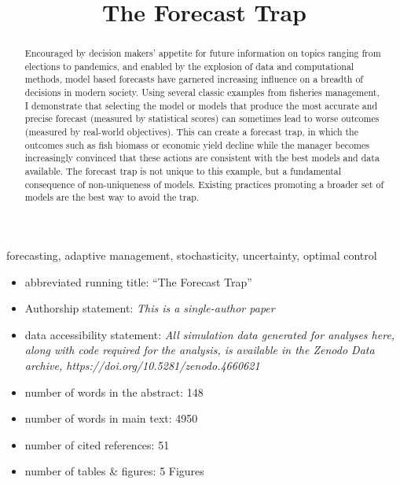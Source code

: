 \documentclass[3p]{elsarticle} %
\providecommand{\tightlist}{%
  \setlength{\itemsep}{0pt}\setlength{\parskip}{0pt}}
\begin{document}
\begin{frontmatter}

  \title{The Forecast Trap}
      \address[a]{Department of Environmental Science, Policy, and
Management, University of California, 130 Mulford Hall Berkeley, CA
94720-3114, USA}
    
  \begin{abstract}
  Encouraged by decision makers' appetite for future information on
  topics ranging from elections to pandemics, and enabled by the
  explosion of data and computational methods, model based forecasts
  have garnered increasing influence on a breadth of decisions in modern
  society. Using several classic examples from fisheries management, I
  demonstrate that selecting the model or models that produce the most
  accurate and precise forecast (measured by statistical scores) can
  sometimes lead to worse outcomes (measured by real-world objectives).
  This can create a forecast trap, in which the outcomes such as fish
  biomass or economic yield decline while the manager becomes
  increasingly convinced that these actions are consistent with the best
  models and data available. The forecast trap is not unique to this
  example, but a fundamental consequence of non-uniqueness of models.
  Existing practices promoting a broader set of models are the best way
  to avoid the trap.
  \end{abstract}
   \begin{keyword} forecasting, adaptive
management, stochasticity, uncertainty, optimal control\end{keyword}
 \end{frontmatter}

\begin{itemize}
\tightlist
\item
  abbreviated running title: ``The Forecast Trap''
\item
  Authorship statement: \emph{This is a single-author paper}
\item
  data accessibility statement: \emph{All simulation data generated for
  analyses here, along with code required for the analysis, is available
  in the Zenodo Data archive, https://doi.org/10.5281/zenodo.4660621}
\item
  number of words in the abstract: 148
\item
  number of words in main text: 4950
\item
  number of cited references: 51
\item
  number of tables \& figures: 5 Figures
\end{itemize}
\end{document}
